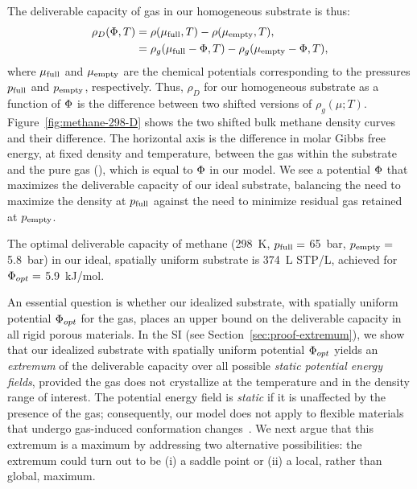 The deliverable capacity of gas in our homogeneous substrate is thus:
\begin{align}
    \rho_D(\Phi,T) &= \rho(\mu_{\text{full}},T) - \rho(\mu_{\text{empty}},T),
    \label{eq:DofPhi}
    \\
    &= \rho_g(\mu_{\text{full}}-\Phi,T) - \rho_g(\mu_{\text{empty}}-\Phi,T),
\end{align}
where $\mu_{\text{full}}$ and $\mu_{\text{empty}}$ are the chemical potentials corresponding to the
pressures $p_{\text{full}}$ and $p_{\text{empty}}$, respectively. Thus, $\rho_D$ for our
homogeneous substrate as a function of $\Phi$ is the difference between two
shifted versions of $\rho_g(\mu; T)$. Figure~\ref{fig:methane-298-D} shows the
two shifted bulk methane density curves and their difference. The horizontal
axis is the difference in molar Gibbs free energy, at fixed density and
temperature, between the gas within the substrate and the pure gas (\gst), which
is equal to $\Phi$ in our model. We see a potential $\Phi$ that maximizes the
deliverable capacity of our ideal substrate, balancing the need to maximize the
density at $p_{\text{full}}$ against the need to minimize residual gas retained at
$p_{\text{empty}}$.

The optimal deliverable capacity of methane (298\ K, $p_{\text{full}}=$ 65\ bar,
$p_{\text{empty}}=$ 5.8\ bar) in our ideal, spatially uniform substrate is 374\ L STP/L,
achieved for $\Phi_{opt} =$ 5.9\ kJ/mol.

An essential question is whether our idealized substrate, with spatially
uniform potential $\Phi_{opt}$ for the gas, places an upper bound on the
deliverable capacity in all rigid porous materials. In the SI (see
Section~\ref{sec:proof-extremum}), we show that our idealized substrate with
spatially uniform potential $\Phi_{opt}$ yields an \emph{extremum} of the
deliverable capacity over all possible \emph{static potential energy fields},
provided the gas does not crystallize at the temperature and in the density
range of interest. The potential energy field is \emph{static} if it is
unaffected by the presence of the gas; consequently, our model does not apply
to flexible materials that undergo gas-induced conformation
changes~\cite{schneemann2014flexible}. We next argue that this extremum is a
maximum by addressing two alternative possibilities: the extremum could turn
out to be (i) a saddle point or (ii) a local, rather than global, maximum.

